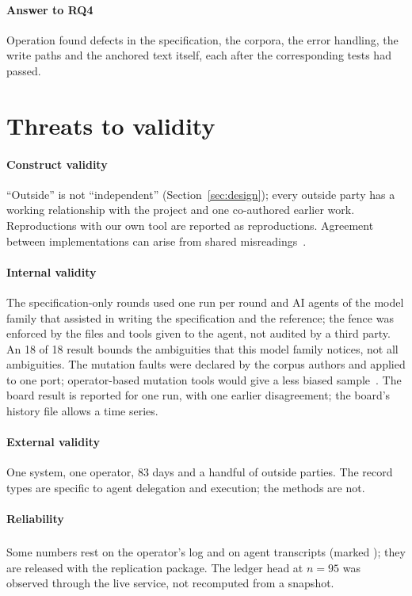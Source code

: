 \documentclass[preprint,12pt,authoryear]{elsarticle}
\newcommand{\priv}{\textsuperscript{\textdagger}}
\begin{document}
\paragraph{Answer to RQ4} Operation found defects in the specification, the corpora, the error handling, the write paths and the anchored text itself, each after the corresponding tests had passed.

\section{Threats to validity}\label{sec:threats}

\paragraph{Construct validity} ``Outside'' is not ``independent'' (Section~\ref{sec:design}); every outside party has a working relationship with the project and one co-authored earlier work. Reproductions with our own tool are reported as reproductions. Agreement between implementations can arise from shared misreadings~\citep{knight1986}.

\paragraph{Internal validity} The specification-only rounds used one run per round and AI agents of the model family that assisted in writing the specification and the reference; the fence was enforced by the files and tools given to the agent, not audited by a third party. An 18 of 18 result bounds the ambiguities that this model family notices, not all ambiguities. The mutation faults were declared by the corpus authors and applied to one port; operator-based mutation tools would give a less biased sample~\citep{just2014}. The board result is reported for one run, with one earlier disagreement; the board's history file allows a time series.

\paragraph{External validity} One system, one operator, 83 days and a handful of outside parties. The record types are specific to agent delegation and execution; the methods are not.

\paragraph{Reliability} Some numbers rest on the operator's log and on agent transcripts (marked \priv); they are released with the replication package. The ledger head at $n=95$ was observed through the live service, not recomputed from a snapshot.
\end{document}
